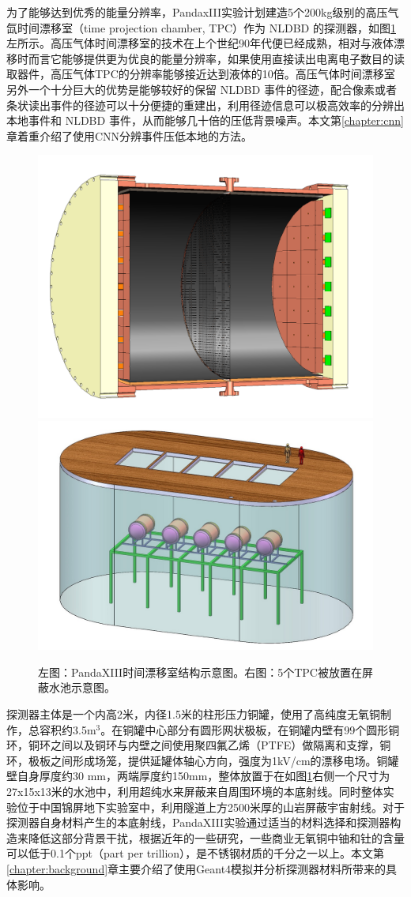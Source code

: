 为了能够达到优秀的能量分辨率，PandaxIII实验计划建造5个200kg级别的高压气氙时间漂移室（time projection chamber, TPC）作为 NLDBD 的探测器，如图\ref{fig:detector}左所示。高压气体时间漂移室的技术在上个世纪90年代便已经成熟，相对与液体漂移时而言它能够提供更为优良的能量分辨率，如果使用直接读出电离电子数目的读取器件，高压气体TPC的分辨率能够接近达到液体的10倍。高压气体时间漂移室另外一个十分巨大的优势是能够较好的保留 NLDBD 事件的径迹，配合像素或者条状读出事件的径迹可以十分便捷的重建出，利用径迹信息可以极高效率的分辨出本地事件和 NLDBD 事件，从而能够几十倍的压低背景噪声。本文第\ref{chapter:cnn}章着重介绍了使用CNN分辨事件压低本地的方法。

\begin{figure}[tbp]
    \centering
    \includegraphics[width=0.4\columnwidth]{pic/fig1.png}
    \includegraphics[width=0.4\columnwidth]{pic/fig2.jpg}
    \caption{左图：PandaXIII时间漂移室结构示意图。右图：5个TPC被放置在屏蔽水池示意图。\supercite{cdr}}
    \label{fig:detector}
\end{figure}
    
探测器主体是一个内高2米，内径1.5米的柱形压力铜罐，使用了高纯度无氧铜制作，总容积约3.5m$^3$。在铜罐中心部分有圆形网状极板，在铜罐内壁有99个圆形铜环，铜环之间以及铜环与内壁之间使用聚四氟乙烯（PTFE）做隔离和支撑，铜环，极板之间形成场笼，提供延罐体轴心方向，强度为1kV/cm的漂移电场。铜罐壁自身厚度约30
mm，两端厚度约150mm，整体放置于在如图\ref{fig:detector}右侧一个尺寸为27x15x13米的水池中，利用超纯水来屏蔽来自周围环境的本底射线。同时整体实验位于中国锦屏地下实验室中，利用隧道上方2500米厚的山岩屏蔽宇宙射线。对于探测器自身材料产生的本底射线，PandaXIII实验通过适当的材料选择和探测器构造来降低这部分背景干扰，根据近年的一些研究，一些商业无氧铜中铀和钍的含量可以低于0.1个ppt（part per trillion）\supercite{abgrall2016majorana}，是不锈钢材质的千分之一以上。本文第\ref{chapter:background}章主要介绍了使用Geant4模拟并分析探测器材料所带来的具体影响。

